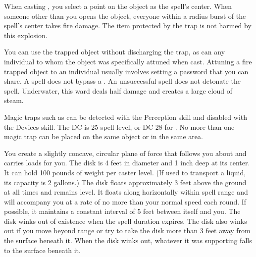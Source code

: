 \spelleffect When casting , you select a point on the object as the spell's center. When someone other than you opens the object, everyone within a \areasmall radius burst of the spell's center takes fire damage. The item protected by the trap is not harmed by this explosion.
\par You can use the trapped object without discharging the trap, as can any individual to whom the object was specifically attuned when cast. Attuning a fire trapped object to an individual usually involves setting a password that you can share.
\spellnotes A  spell does not bypass a . An unsuccessful  spell does not detonate the spell. Underwater, this ward deals half damage and creates a large cloud of steam.
\par Magic traps such as  can be detected with the Perception skill and disabled with the Devices skill. The DC is 25 \add spell level, or DC 28 for . No more than one magic trap can be placed on the same object or in the same area.

\spelldur{\durext \dismissable}
\spelleffect You create a slightly concave, circular plane of force that follows you about and carries loads for you. The disk is 4 feet in diameter and 1 inch deep at its center. It can hold 100 pounds of weight per caster level. (If used to transport a liquid, its capacity is 2 gallons.) The disk floats approximately 3 feet above the ground at all times and remains level. It floats along horizontally within spell range and will accompany you at a rate of no more than your normal speed each round. If possible, it maintains a constant interval of 5 feet between itself and you. The disk winks out of existence when the spell duration expires. The disk also winks out if you move beyond range or try to take the disk more than 3 feet away from the surface beneath it. When the disk winks out, whatever it was supporting falls to the surface beneath it.

